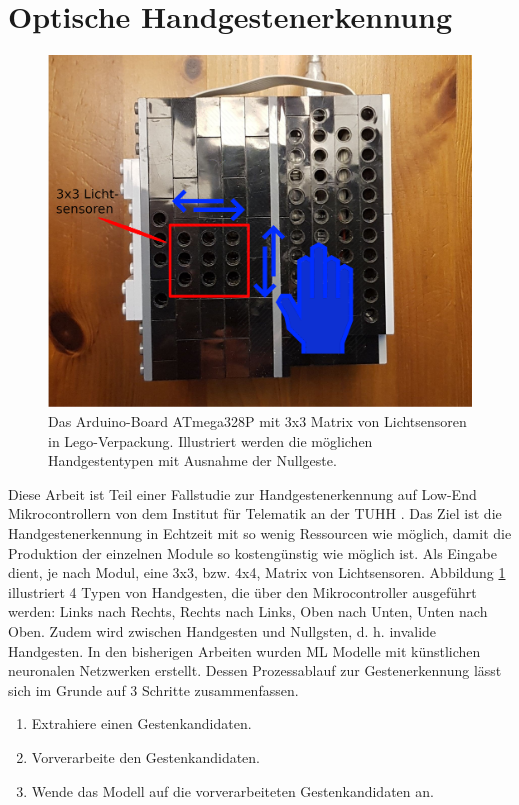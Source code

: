 \section{Optische Handgestenerkennung}
\label{sec:fallstudie}
\begin{figure}
    \centering
    \includegraphics[width=0.6\linewidth]{images/arduino_ex.png}
    \caption{Das Arduino-Board ATmega328P mit 3x3 Matrix von Lichtsensoren in Lego-Verpackung. Illustriert werden die möglichen Handgestentypen mit Ausnahme der Nullgeste.}
    \label{fig:arduino_ex}
\end{figure}
Diese Arbeit ist Teil einer Fallstudie zur Handgestenerkennung auf Low-End Mikrocontrollern von dem Institut für Telematik an der TUHH \cite{venzkeArticle}. Das Ziel ist die Handgestenerkennung in Echtzeit mit so wenig
Ressourcen wie möglich, damit die Produktion der einzelnen Module so kostengünstig wie möglich ist. Als Eingabe dient, je nach Modul, eine 3x3, bzw. 4x4, Matrix von Lichtsensoren. Abbildung \ref{fig:arduino_ex}
illustriert 4 Typen von Handgesten, die über den Mikrocontroller ausgeführt werden: Links nach Rechts, Rechts nach Links, Oben nach Unten, Unten nach Oben. Zudem wird zwischen Handgesten und Nullgsten, d. h.
invalide Handgesten. In den bisherigen Arbeiten wurden ML Modelle mit künstlichen neuronalen Netzwerken erstellt. Dessen Prozessablauf zur Gestenerkennung lässt sich im Grunde auf 3 Schritte zusammenfassen.
\begin{enumerate}
    \item Extrahiere einen Gestenkandidaten.
    \item Vorverarbeite den Gestenkandidaten.
    \item Wende das Modell auf die vorverarbeiteten Gestenkandidaten an.
\end{enumerate}





